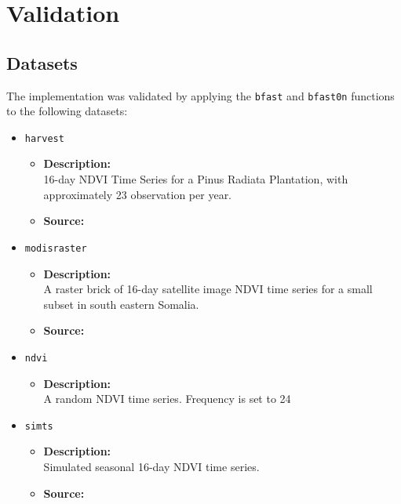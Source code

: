 \documentclass[main.tex]{subfiles}
\begin{document}
\chapter{Validation}
\label{chap:validation}
\section{Datasets}
\label{sec:datasets}
The implementation was validated by applying the \texttt{bfast} and \texttt{bfast0n} functions
to the following datasets:
\begin{itemize}
\item \texttt{harvest}
  \begin{itemize}
  \item \textbf{Description:}\\
  16-day NDVI Time Series for a Pinus Radiata Plantation, with approximately 23
  observation per year.
  \item \textbf{Source:} \cite{bfast}
  \end{itemize}
\item \texttt{modisraster}
  \begin{itemize}
  \item \textbf{Description:}\\ A raster brick of 16-day satellite image NDVI
    time series for a small subset in south eastern Somalia.
  \item \textbf{Source:} \cite{bfast_monitor1}
  \end{itemize}
\item \texttt{ndvi}
  \begin{itemize}
  \item \textbf{Description:}\\ A random NDVI time series. Frequency is set to 24
  \end{itemize}
\item \texttt{simts}
  \begin{itemize}
  \item \textbf{Description:}\\ Simulated seasonal 16-day NDVI time series.
  \item \textbf{Source:} \cite{bfast}
  \end{itemize}
\end{itemize}

\biblio
\end{document}
